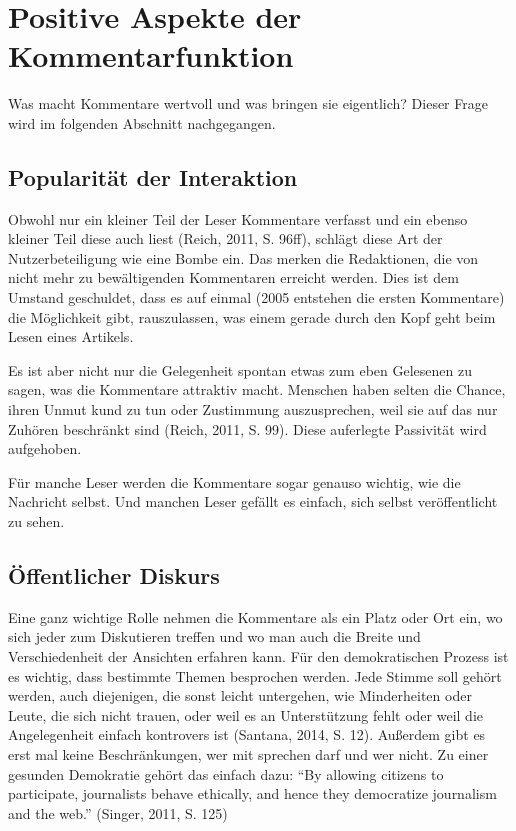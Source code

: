 \section{Positive Aspekte der Kommentarfunktion}

Was macht Kommentare wertvoll und was bringen sie eigentlich? Dieser Frage wird
im folgenden Abschnitt nachgegangen.


\subsection{Popularität der Interaktion}

Obwohl nur ein kleiner Teil der Leser Kommentare verfasst und ein ebenso kleiner
Teil diese auch liest (Reich, 2011, S. 96ff), schlägt diese Art der
Nutzerbeteiligung wie eine Bombe ein. Das merken die Redaktionen, die von nicht
mehr zu bewältigenden Kommentaren erreicht werden. Dies ist dem Umstand
geschuldet, dass es auf einmal (2005 entstehen die ersten Kommentare) die
Möglichkeit gibt, rauszulassen, was einem gerade durch den Kopf geht beim Lesen
eines Artikels.

Es ist aber nicht nur die Gelegenheit spontan etwas zum eben Gelesenen zu sagen,
was die Kommentare attraktiv macht. Menschen haben selten die Chance, ihren
Unmut kund zu tun oder Zustimmung auszusprechen, weil sie auf das nur Zuhören
beschränkt sind (Reich, 2011, S. 99). Diese auferlegte Passivität wird
aufgehoben.

Für manche Leser werden die Kommentare sogar genauso wichtig, wie die Nachricht
selbst. Und manchen Leser gefällt es einfach, sich selbst veröffentlicht zu
sehen.


\subsection{Öffentlicher Diskurs}

Eine ganz wichtige Rolle nehmen die Kommentare als ein Platz oder Ort ein, wo
sich jeder zum Diskutieren treffen und wo man auch die Breite und
Verschiedenheit der Ansichten erfahren kann. Für den demokratischen Prozess ist
es wichtig, dass bestimmte Themen besprochen werden. Jede Stimme soll gehört
werden, auch diejenigen, die sonst leicht untergehen, wie Minderheiten oder
Leute, die sich nicht trauen, oder weil es an Unterstützung fehlt oder weil die
Angelegenheit einfach kontrovers ist (Santana, 2014, S. 12). Außerdem gibt es erst mal 
keine Beschränkungen, wer mit sprechen darf und wer nicht.
Zu einer gesunden Demokratie gehört das einfach dazu: 
``By allowing citizens to participate,
journalists behave ethically, and hence they democratize journalism and
the web.'' (Singer, 2011, S. 125)

